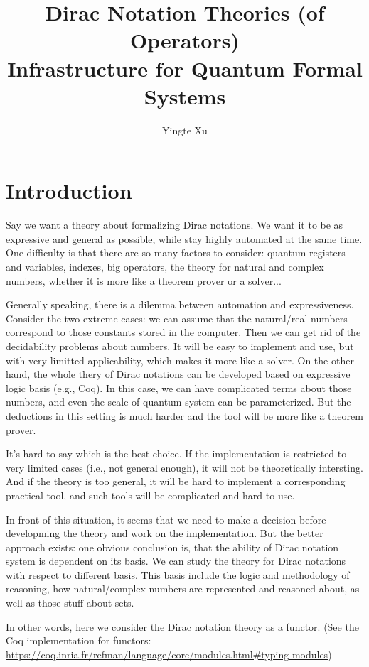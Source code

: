 \documentclass{article}
\title{\textbf{Dirac Notation Theories (of Operators)}\\ 
\Large{Infrastructure for Quantum Formal Systems}}
\author{Yingte Xu}
\begin{document}
\maketitle

\section{Introduction}

Say we want a theory about formalizing Dirac notations. We want it to be as expressive and general as possible, while stay highly automated at the same time. One difficulty is that there are so many factors to consider: quantum registers and variables, indexes, big operators, the theory for natural and complex numbers, whether it is more like a theorem prover or a solver... 

Generally speaking, there is a dilemma between automation and expressiveness. Consider the two extreme cases: we can assume that the natural/real numbers correspond to those constants stored in the computer. Then we can get rid of the decidability problems about numbers. It will be easy to implement and use, but with very limitted applicability, which makes it more like a solver. On the other hand, the whole thery of Dirac notations can be developed based on expressive logic basis (e.g., Coq). In this case, we can have complicated terms about those numbers, and even the scale of quantum system can be parameterized. But the deductions in this setting is much harder and the tool will be more like a theorem prover.

It's hard to say which is the best choice. If the implementation is restricted to very limited cases (i.e., not general enough), it will not be theoretically intersting. And if the theory is too general, it will be hard to implement a corresponding practical tool, and such tools will be complicated and hard to use.

In front of this situation, it seems that we need to make a decision before developming the theory and work on the implementation. But the better approach exists: one obvious conclusion is, that the ability of Dirac notation system is dependent on its basis. We can study the theory for Dirac notations with respect to different basis.
This basis include the logic and methodology of reasoning, how natural/complex numbers are represented and reasoned about, as well as those stuff about sets. 

In other words, here we consider the Dirac notation theory as a functor. (See the Coq implementation for functors: \url{https://coq.inria.fr/refman/language/core/modules.html\#typing-modules})
\end{document}
